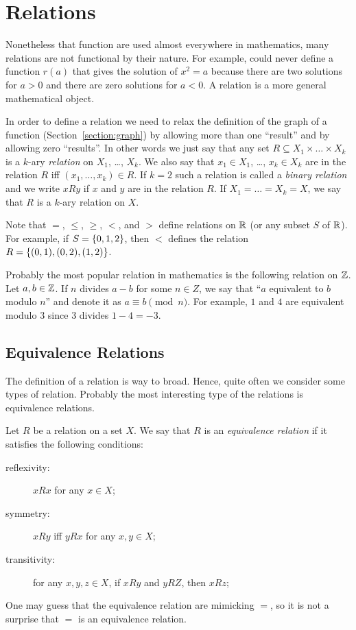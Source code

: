 \chapter{Relations}
Nonetheless that function are used almost everywhere in mathematics, many
relations are not functional by their nature. For example, could never define a
function $r(a)$ that gives the solution of $x^2 = a$ because there are two
solutions for $a > 0$ and there are zero solutions for $a < 0$. A relation is a
more general mathematical object.

In order to define a relation we need to relax the definition of the graph of a
function (Section~\ref{section:graph}) by allowing more than one ``result'' and
by allowing zero ``results''. In other words we just say that any set $R
\subseteq X_1 \times \dots \times X_k$ is a $k$-ary \textit{relation} on $X_1$,
\dots, $X_k$. We also say that $x_1 \in X_1$, \dots, $x_k \in X_k$ are in the
relation $R$ iff $(x_1, \dots, x_k) \in R$. If $k = 2$ such a relation is
called a \textit{binary relation} and we write $x R y$ if $x$ and $y$ are in
the relation $R$. If $X_1 = \dots = X_k = X$, we say that $R$ is a $k$-ary
relation on $X$.

Note that $=$, $\le$, $\ge$, $<$, and $>$ define relations on $\mathbb{R}$ (or any
subset $S$ of $\mathbb{R}$). For example, if $S = \set{0, 1, 2}$, then $<$ defines
the relation $R = \set{(0, 1), (0, 2), (1, 2)}$.

Probably the most popular relation in mathematics is the following relation on
$\mathbb{Z}$. Let $a, b \in \mathbb{Z}$. If $n$ divides $a - b$ for some $n \in Z$, we say that
``$a$ equivalent to $b$ modulo $n$'' and denote it as $a \equiv b \pmod{n}$.
For example, $1$ and $4$ are equivalent modulo $3$ since $3$ divides
$1 - 4 = -3$.

\section{Equivalence Relations}
The definition of a relation is way to broad. Hence, quite often we consider
some types of relation. Probably the most interesting type of the relations is
equivalence relations.

\begin{definition}
  Let $R$ be a relation on a set $X$. We say that $R$ is an \textit{equivalence
  relation} if it satisfies the following conditions:
  \begin{description}
    \item[reflexivity:]  $x R x$ for any $x \in X$;
    \item[symmetry:]  $x R y$ iff $y R x$ for any $x, y \in X$;
    \item[transitivity:]  for any $x, y, z \in X$, if $x R y$ and $y R Z$, then
      $x R z$;
  \end{description}
\end{definition}
One may guess that the equivalence relation are mimicking $=$, so it is not a
surprise that $=$ is an equivalence relation.

